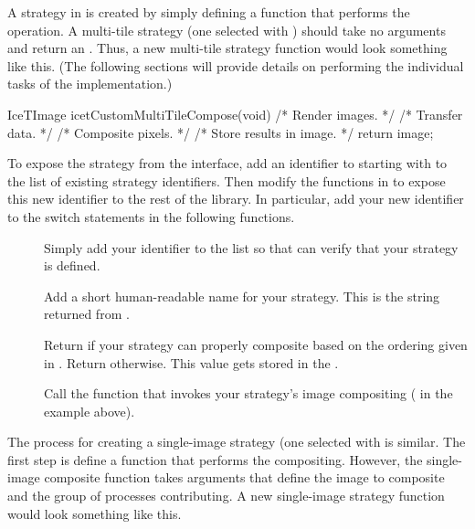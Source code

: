 A strategy in \IceT is created by simply defining a function that performs
the operation.  A multi-tile strategy (one selected with
) should take no arguments and return an
.  Thus, a new multi-tile strategy function would look
something like this.  (The following sections will provide details on
performing the individual tasks of the implementation.)

\begin{code}
IceTImage icetCustomMultiTileCompose(void)
{
    /* Render images. */
    /* Transfer data. */
    /* Composite pixels. */
    /* Store results in image. */
    return image;
}
\end{code}

To expose the strategy from the \IceT interface, add an identifier to
 starting with  to the list of
existing strategy identifiers.  Then modify the functions in
 to expose this new identifier to the rest
of the \IceT library.  In particular, add your new identifier to the switch
statements in the following functions.

\begin{description}
\item[] Simply add your identifier to the
  list so that \IceT can verify that your strategy is defined.
\item[] Add a short human-readable
  name for your strategy.  This is the string returned from
  .
\item[] Return 
  if your strategy can properly composite based on the ordering given in
  .  Return  otherwise.
  This value gets stored in the .
\item[] Call the function that invokes
  your strategy's image compositing ( in
  the example above).
\end{description}

The process for creating a single-image strategy (one selected with
 is similar.  The first step is define a
function that performs the compositing.  However, the single-image
composite function takes arguments that define the image to composite and
the group of processes contributing.  A new single-image strategy function
would look something like this.

